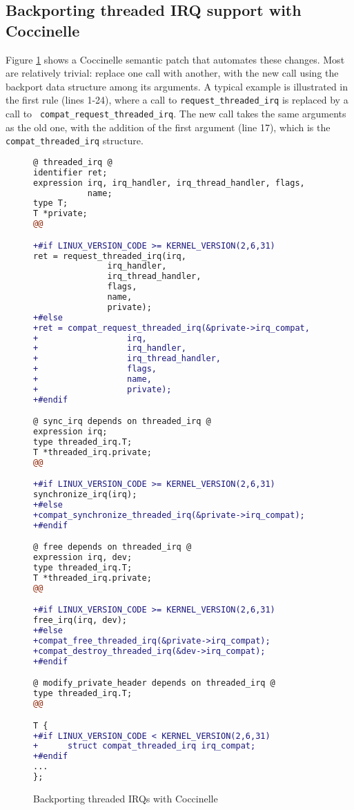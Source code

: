 \subsection{Backporting threaded IRQ support with Coccinelle}

Figure \ref{thrdirq} shows a Coccinelle semantic patch that automates these
changes.  Most are relatively trivial: replace one call with another,
with the new call using the backport data structure among its arguments.  A
typical example is illustrated in the first rule (lines 1-24), where a call
to {\tt request\_\-threa\-ded\_\-irq} is replaced by a call to {\tt
  compat\_\-request\_\-threa\-ded\_\-irq}.  The new call takes the same
arguments as the old one, with the addition of the
first argument (line 17), which is the {\tt compat\_\-threa\-ded\_\-irq}
structure.

\begin{figure}
\begin{lstlisting}[language=diff]
@ threaded_irq @
identifier ret;
expression irq, irq_handler, irq_thread_handler, flags,
           name;
type T;
T *private;
@@

+#if LINUX_VERSION_CODE >= KERNEL_VERSION(2,6,31)
ret = request_threaded_irq(irq,
			   irq_handler,
			   irq_thread_handler,
			   flags,
			   name,
			   private);
+#else
+ret = compat_request_threaded_irq(&private->irq_compat,
+				   irq,
+				   irq_handler,
+				   irq_thread_handler,
+				   flags,
+				   name,
+				   private);
+#endif

@ sync_irq depends on threaded_irq @
expression irq;
type threaded_irq.T;
T *threaded_irq.private;
@@

+#if LINUX_VERSION_CODE >= KERNEL_VERSION(2,6,31)
synchronize_irq(irq);
+#else
+compat_synchronize_threaded_irq(&private->irq_compat);
+#endif

@ free depends on threaded_irq @
expression irq, dev;
type threaded_irq.T;
T *threaded_irq.private;
@@

+#if LINUX_VERSION_CODE >= KERNEL_VERSION(2,6,31)
free_irq(irq, dev);
+#else
+compat_free_threaded_irq(&private->irq_compat);
+compat_destroy_threaded_irq(&dev->irq_compat);
+#endif

@ modify_private_header depends on threaded_irq @
type threaded_irq.T;
@@

T {
+#if LINUX_VERSION_CODE < KERNEL_VERSION(2,6,31)
+      struct compat_threaded_irq irq_compat;
+#endif
...
};
\end{lstlisting}
\caption{Backporting threaded IRQs with Coccinelle}
\label{thrdirq}
\end{figure}

